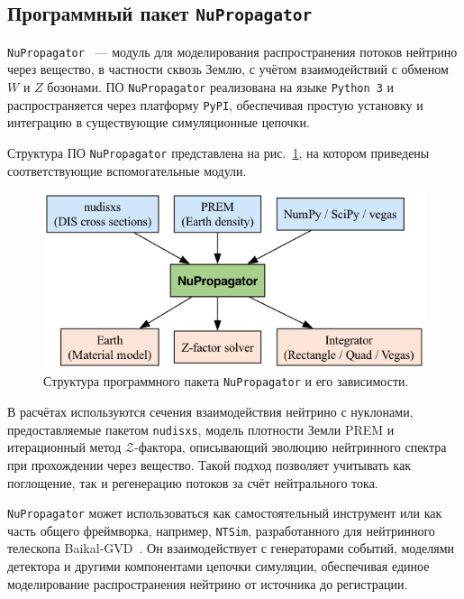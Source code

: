 \subsection{Программный пакет \texttt{NuPropagator}}

\texttt{NuPropagator}~\cite{nupropagator2022} — модуль для моделирования распространения потоков нейтрино через вещество, в частности сквозь Землю, с учётом взаимодействий с обменом $W$ и $Z$ бозонами. 
ПО \texttt{NuPropagator} реализована на языке \texttt{Python~3} и распространяется через платформу \texttt{PyPI}, обеспечивая простую установку и интеграцию в существующие симуляционные цепочки.

Структура ПО \texttt{NuPropagator} представлена на рис.~\ref{fig:nupropagator1}, на котором приведены соответствующие вспомогательные модули.
\begin{figure}[!h]
\centering
\includegraphics[width=\linewidth]{images/nupropagator_diagram.png}
\caption{Структура программного пакета \texttt{NuPropagator} и его зависимости.}
\label{fig:nupropagator1}
\end{figure}

В расчётах используются сечения взаимодействия нейтрино с нуклонами, предоставляемые пакетом \texttt{nudisxs}, модель плотности Земли PREM и итерационный метод $\mathcal{Z}$-фактора, описывающий эволюцию нейтринного спектра при прохождении через вещество. 
Такой подход позволяет учитывать как поглощение, так и регенерацию потоков за счёт нейтрального тока.

\texttt{NuPropagator} может использоваться как самостоятельный инструмент или как часть общего фреймворка, например, \texttt{NTSim}, разработанного для нейтринного телескопа Baikal-GVD~\cite{ntsim2025}. 
Он взаимодействует с генераторами событий, моделями детектора и другими компонентами цепочки симуляции, обеспечивая единое моделирование распространения нейтрино от источника до регистрации.
